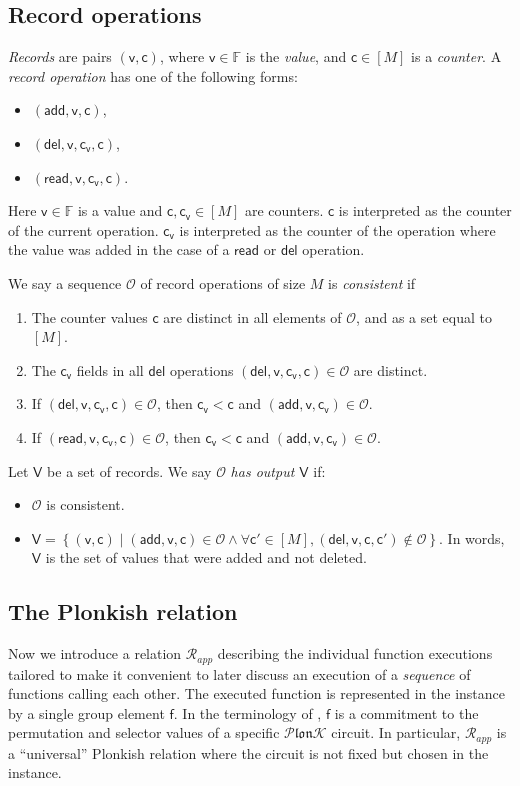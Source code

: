 \documentclass[11pt]{article} %
\newcommand{\plonk}{\ensuremath{\mathcal{P} \mathfrak{lon}\mathcal{K}}\xspace}
\newcommand{\F}{\ensuremath{\mathbb F}\xspace}
\newcommand{\rel}{\ensuremath{\mathcal{R}}\xspace}
\newcommand{\set}[1]{\ensuremath{\left\{#1\right\}}\xspace}
\renewcommand{\c}{\ensuremath{\mathsf{c}}\xspace}
\newcommand{\vc}{\ensuremath{\mathsf{c_v}}\xspace}
\renewcommand{\v}{\ensuremath{\mathsf{v}}\xspace}
\newcommand{\f}{\ensuremath{\mathsf{f}}\xspace}
\newcommand{\relapp}{\ensuremath{\rel_{app}}\xspace}
\newcommand{\add}{\ensuremath{\mathsf{add}}\xspace}
\newcommand{\del}{\ensuremath{\mathsf{del}}\xspace}
\renewcommand{\read}{\ensuremath{\mathsf{read}}\xspace}
\newcommand{\countrange}{\ensuremath{[M]}\xspace}
\newcommand{\ops}{\ensuremath{\mathcal{O}}\xspace}
\newcommand{\recset}{\ensuremath{\mathsf{V}}\xspace}
\begin{document}
\subsection{Record operations}
\label{sec:exec_model:record_ops}
\emph{Records} are pairs $(\v,\c)$, where $\v\in \F$ is the \emph{value}, and $\c\in \countrange$ is a \emph{counter}.
A \emph{record operation} has one of the following forms:
\begin{itemize}
 \item $(\add,\v,\c)$,
\item $(\del,\v,\vc,\c)$,
\item $(\read,\v,\vc,\c)$.
\end{itemize}
Here $\v\in \F$ is a value and $\c,\vc \in \countrange$ are counters.
$\c$ is interpreted as the counter of the current operation.
$\vc$ is interpreted as the counter of the operation where
the value was added in the case of a \read or \del operation.



We say a sequence \ops of record operations of size $M$ is \emph{consistent} if
\begin{enumerate}
\item The counter values $\c$ are distinct in all elements of \ops, and as a set equal to \countrange.
\item The $\vc$ fields in all $\del$ operations $(\del,\v,\vc,\c)\in \ops$ are distinct.
\item If $(\del,\v,\vc,\c)\in \ops$, then $\vc<\c$ and $(\add,\v,\vc)\in \ops$.
\item If $(\read,\v,\vc,\c)\in \ops$, then $\vc<\c$ and $(\add,\v,\vc)\in \ops$.
\end{enumerate}

Let \recset be a set of records.
We say $\ops$ \emph{has output \recset} if:
\begin{itemize}
 \item $\ops$ is consistent.
 \item $\recset=\set{(\v,\c) \mid (\add,\v,\c)\in \ops \land \forall \c'\in \countrange,(\del,\v,\c,\c')\notin \ops}$. In words,
 \recset is the set of values that were added and not deleted.
\end{itemize}



\subsection{The Plonkish relation}
\label{sec:exec_model:relation}
Now we introduce a relation \relapp describing the individual function executions tailored to make it convenient to later discuss an execution of a \emph{sequence} of functions calling each other.
The executed function is represented in the instance by a single group element \f. In the terminology of \cite{plonk}, \f is a commitment to the permutation and selector values of a specific \plonk circuit. In particular, \relapp is a ``universal'' Plonkish relation where the circuit is not fixed but chosen in the instance. 
\end{document}
